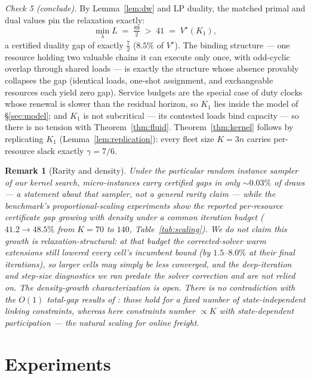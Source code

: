 \documentclass[11pt]{article}
\newtheorem{remark}{Remark}
\newcommand{\Vstar}{V^{\star}}
\begin{document}
\emph{Check 5 (conclude).} By Lemma~\ref{lem:dw} and LP duality, the
matched primal and dual values pin the relaxation exactly:
\[
  \min_{\lambda} L \;=\; \tfrac{89}{2} \;>\; 41 \;=\; \Vstar(K_1),
\]
a certified duality gap of exactly $\tfrac{7}{2}$ ($8.5\%$ of
$\Vstar$). The binding structure ---
one resource holding two valuable chains it can execute only once, with
odd-cyclic overlap through shared loads --- is exactly the structure
whose absence provably collapses the gap (identical loads, one-shot
assignment, and exchangeable resources each yield zero gap).
Service budgets are the special case of duty clocks whose renewal is
slower than the residual horizon, so $K_1$ lies inside the model of
\S\ref{sec:model}; and $K_1$ is not subcritical --- its contested loads
bind capacity --- so there is no tension with
Theorem~\ref{thm:fluid}. Theorem~\ref{thm:kernel} follows by
replicating $K_1$ (Lemma~\ref{lem:replication}): every fleet size
$K = 3n$ carries per-resource slack exactly $\gamma = 7/6$.

\begin{remark}[Rarity and density]
Under the particular random instance sampler of our kernel search,
micro-instances carry certified gaps in only ${\sim}0.03\%$ of draws
--- a statement about that sampler, not a general rarity claim ---
while the benchmark's proportional-scaling experiments show the
\emph{reported} per-resource certificate gap growing with density
under a common iteration budget ($41.2 \to 48.5\%$ from $K = 70$ to
$140$, Table~\ref{tab:scaling}). We do not claim this growth is
relaxation-structural: at that budget the corrected-solver warm
extensions still lowered every cell's incumbent bound (by
$1.5$--$8.0\%$ at their final iterations), so larger cells may
simply be less converged, and the deep-iteration and step-size
diagnostics we ran predate the solver correction and are not relied
on. The density-growth characterization is open. There is no contradiction with the $O(1)$ total-gap results of
\citet{brownzhang2023strength}: those hold for a fixed number of
state-independent linking constraints, whereas here constraints number
$\propto K$ with state-dependent participation --- the natural scaling
for online freight.
\end{remark}

\section{Experiments}
\label{sec:experiments}
\end{document}

